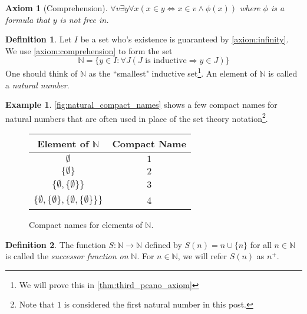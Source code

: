 \documentclass{article}
\theoremstyle{definition}
\newtheorem{definition}{Definition}[section]
\theoremstyle{definition}
\newtheorem{example}{Example}[section]
\theoremstyle{plain}
\theoremstyle{remark}
\theoremstyle{plain}
\theoremstyle{remark}
\theoremstyle{plain}
\theoremstyle{plain}
\theoremstyle{plain}
\newtheorem{axiom}{Axiom}[section]
\theoremstyle{plain}
\begin{document}
\begin{axiom}[Comprehension]
  \( 
    \forall v \exists y \forall x 
    (x \in y \Leftrightarrow x \in v \land \phi(x)) 
  \) 
  where 
  \( \phi \) is a formula that \( y \) is not free in.
  \label{axiom:comprehension}
\end{axiom}


\begin{definition}
  Let \( I \) be a set who's existence is guaranteed by 
  \autoref{axiom:infinity}. We use \autoref{axiom:comprehension} to form the set 
  \[ 
    \mathbb{N} 
    = 
    \{y \in I : \forall J ( J \text{ is inductive} \Rightarrow y \in J )\}
  \] 
  One should think of \( \mathbb{N} \) as the 
  ``smallest" inductive set\footnote{We will prove this in 
  \autoref{thm:third_peano_axiom}}. An 
  element of \( \mathbb{N} \) is called a \textit{natural number}.
  \label{def:natural_numbers}
\end{definition}

\begin{example}
  \label{example:compact_numbers}
  \autoref{fig:natural_compact_names} shows a few compact names for natural 
  numbers that are often used in place of the set theory 
  notation\footnote{Note that \( 1 \) is considered the first natural number in 
  this post.}.
\end{example}

\begin{figure}[h]
    \centering
    \begin{tabular}{ c | c }
      Element of \(\mathbb{N}\)  & Compact Name  \\
      \hline
      \(\emptyset\)                                                        & \(1\) \\
      \(\{\emptyset\}\)                                                    & \( 2 \) \\ 
      \(\{\emptyset, \{\emptyset\}\}\)                                     & \(3\) \\
      \(\{ \emptyset, \{\emptyset\}, \{\emptyset, \{ \emptyset \} \} \} \) & 4 
    \end{tabular} 
    \caption{Compact names for elements of \( \mathbb{N}\).}
    \label{fig:natural_compact_names}
\end{figure}

\begin{definition}
  The function \( S: \mathbb{N} \rightarrow \mathbb{N} \) defined by 
  \( S(n) = n \cup \{n\} \) for all \( n \in \mathbb{N} \) is called the 
  \textit{successor function on} \( \mathbb{N} \). For \( n \in \mathbb{N} \), 
  we will refer \( S(n) \) as \( n^{+} \).
\end{definition}
\end{document}
